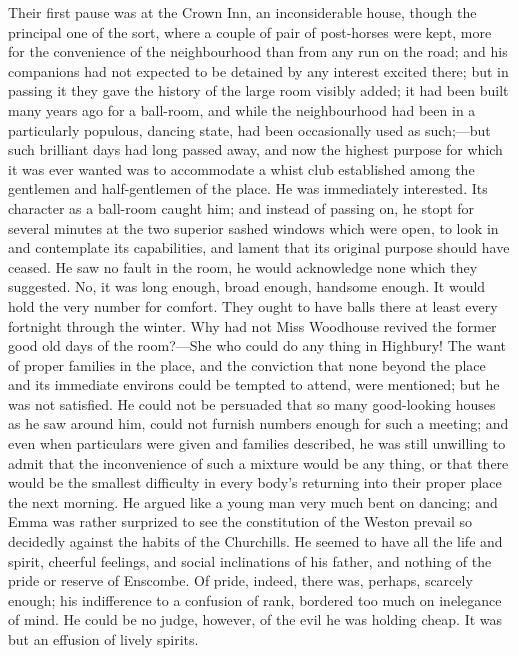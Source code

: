 Their first pause was at the Crown Inn, an inconsiderable house, though the principal one of the sort, where a couple of pair of post-horses were kept, more for the convenience of the neighbourhood than from any run on the road; and his companions had not expected to be detained by any interest excited there; but in passing it they gave the history of the large room visibly added; it had been built many years ago for a ball-room, and while the neighbourhood had been in a particularly populous, dancing state, had been occasionally used as such;---but such brilliant days had long passed away, and now the highest purpose for which it was ever wanted was to accommodate a whist club established among the gentlemen and half-gentlemen of the place. He was immediately interested. Its character as a ball-room caught him; and instead of passing on, he stopt for several minutes at the two superior sashed windows which were open, to look in and contemplate its capabilities, and lament that its original purpose should have ceased. He saw no fault in the room, he would acknowledge none which they suggested. No, it was long enough, broad enough, handsome enough. It would hold the very number for comfort. They ought to have balls there at least every fortnight through the winter. Why had not Miss Woodhouse revived the former good old days of the room?---She who could do any thing in Highbury! The want of proper families in the place, and the conviction that none beyond the place and its immediate environs could be tempted to attend, were mentioned; but he was not satisfied. He could not be persuaded that so many good-looking houses as he saw around him, could not furnish numbers enough for such a meeting; and even when particulars were given and families described, he was still unwilling to admit that the inconvenience of such a mixture would be any thing, or that there would be the smallest difficulty in every body's returning into their proper place the next morning. He argued like a young man very much bent on dancing; and Emma was rather surprized to see the constitution of the Weston prevail so decidedly against the habits of the Churchills. He seemed to have all the life and spirit, cheerful feelings, and social inclinations of his father, and nothing of the pride or reserve of Enscombe. Of pride, indeed, there was, perhaps, scarcely enough; his indifference to a confusion of rank, bordered too much on inelegance of mind. He could be no judge, however, of the evil he was holding cheap. It was but an effusion of lively spirits.

